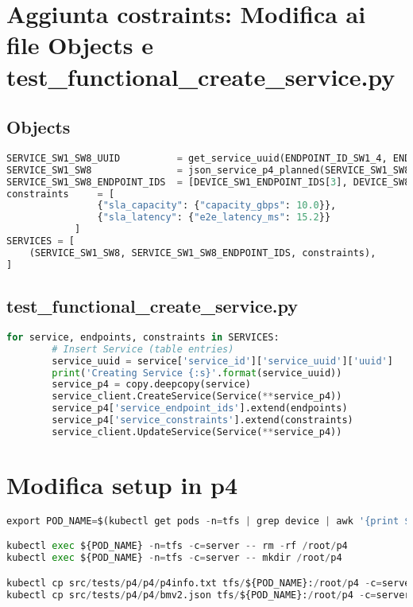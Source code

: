 \section{Aggiunta costraints: Modifica ai file Objects e test\_functional\_create\_service.py}
\subsection{Objects}
\begin{lstlisting}[language=Python]
SERVICE_SW1_SW8_UUID          = get_service_uuid(ENDPOINT_ID_SW1_4, ENDPOINT_ID_SW8_4)
SERVICE_SW1_SW8               = json_service_p4_planned(SERVICE_SW1_SW8_UUID)
SERVICE_SW1_SW8_ENDPOINT_IDS  = [DEVICE_SW1_ENDPOINT_IDS[3], DEVICE_SW8_ENDPOINT_IDS[3]]
constraints     = [
                {"sla_capacity": {"capacity_gbps": 10.0}},
                {"sla_latency": {"e2e_latency_ms": 15.2}}
            ]
SERVICES = [
    (SERVICE_SW1_SW8, SERVICE_SW1_SW8_ENDPOINT_IDS, constraints),
]
\end{lstlisting}
\subsection{test\_functional\_create\_service.py}
\begin{lstlisting}[language=Python]
    for service, endpoints, constraints in SERVICES:
        # Insert Service (table entries)
        service_uuid = service['service_id']['service_uuid']['uuid']
        print('Creating Service {:s}'.format(service_uuid))
        service_p4 = copy.deepcopy(service)
        service_client.CreateService(Service(**service_p4))
        service_p4['service_endpoint_ids'].extend(endpoints)
        service_p4['service_constraints'].extend(constraints)
        service_client.UpdateService(Service(**service_p4))
\end{lstlisting}
\section{Modifica setup in p4}
\begin{lstlisting}[language=Python]
export POD_NAME=$(kubectl get pods -n=tfs | grep device | awk '{print $1}')

kubectl exec ${POD_NAME} -n=tfs -c=server -- rm -rf /root/p4
kubectl exec ${POD_NAME} -n=tfs -c=server -- mkdir /root/p4

kubectl cp src/tests/p4/p4/p4info.txt tfs/${POD_NAME}:/root/p4 -c=server
kubectl cp src/tests/p4/p4/bmv2.json tfs/${POD_NAME}:/root/p4 -c=server
\end{lstlisting}

